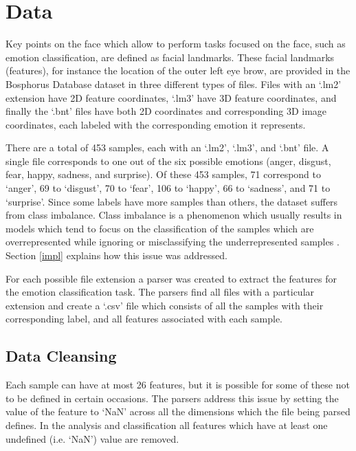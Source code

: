 \section{Data}

Key points on the face which allow to perform tasks focused on the face, such as emotion classification, are defined as facial landmarks. These facial landmarks (features), for instance the location of the outer left eye brow, are provided in the Bosphorus Database dataset in three different types of files. Files with an `.lm2' extension have 2D feature coordinates, `.lm3' have 3D feature coordinates, and finally the `.bnt' files have both 2D coordinates and corresponding 3D image coordinates, each labeled with the corresponding emotion it represents.

There are a total of 453 samples, each with an `.lm2', `.lm3', and `.bnt' file. A single file corresponds to one out of the six possible emotions (anger, disgust, fear, happy, sadness, and surprise). Of these 453 samples, 71 correspond to `anger', 69 to `disgust', 70 to `fear', 106 to `happy', 66 to `sadness', and 71 to `surprise'. Since some labels have more samples than others, the dataset suffers from class imbalance. Class imbalance is a phenomenon which usually results in models which tend to focus on the classification of the samples which are overrepresented while ignoring or misclassifying the underrepresented samples \cite{data-mining-intro}. Section \ref{impl} explains how this issue was addressed.

For each possible file extension a parser was created to extract the features for the emotion classification task. The parsers find all files with a particular extension and create a `.csv' file which consists of all the samples with their corresponding label, and all features associated with each sample.

\subsection{Data Cleansing}

Each sample can have at most 26 features, but it is possible for some of these not to be defined in certain occasions. The parsers address this issue by setting the value of the feature to `NaN' across all the dimensions which the file being parsed defines. In the analysis and classification all features which have at least one undefined (i.e. `NaN') value are removed.

